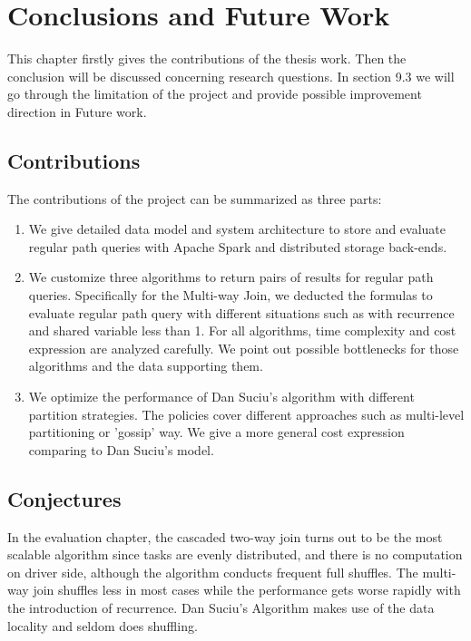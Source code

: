 
\chapter{\label{cha:conclusions}Conclusions and Future Work}

This chapter firstly gives the contributions of the thesis work. Then the conclusion will be discussed concerning research questions. In section 9.3 we will go through the limitation of the project and provide possible improvement direction in Future work.

\section{Contributions}
The contributions of the project can be summarized as three parts:
\begin{enumerate}
    \item We give detailed data model and system architecture to store and evaluate regular path queries with Apache Spark and distributed storage back-ends.
    \item We customize three algorithms to return pairs of results for regular path queries. Specifically for the Multi-way Join, we deducted the formulas to evaluate regular path query with different situations such as with recurrence and shared variable less than 1. For all algorithms, time complexity and cost expression are analyzed carefully. We point out possible bottlenecks for those algorithms and the data supporting them.
    \item We optimize the performance of Dan Suciu's algorithm with different partition strategies. The policies cover different approaches such as multi-level partitioning or 'gossip' way. We give a more general cost expression comparing to Dan Suciu's model.
\end{enumerate}

\section{Conjectures}
In the evaluation chapter, the cascaded two-way join turns out to be the most scalable algorithm since tasks are evenly distributed, and there is no computation on driver side, although the algorithm conducts frequent full shuffles. The multi-way join shuffles less in most cases while the performance gets worse rapidly with the introduction of recurrence. Dan Suciu's Algorithm makes use of the data locality and seldom does shuffling.

